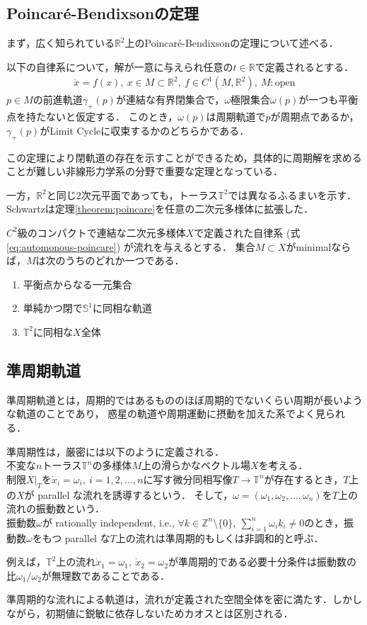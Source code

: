 \documentclass[../main]{subfiles}
\begin{document}
\subsection{Poincaré-Bendixsonの定理}
まず，広く知られている$\mathbb{R}^2$上のPoincaré-Bendixsonの定理について述べる．
\begin{theorem}
    以下の自律系について，解が一意に与えられ任意の$t\in\mathbb{R}$で定義されるとする．
    \begin{align}
        \dot{x}=f(x),\ x\in M\subset \mathbb{R}^2,\ f\in C^1(M,\mathbb{R}^2),\ M:\mathrm{open}         \label{eq:automonous-poincare}
    \end{align}
    $p\in M$の前進軌道$\gamma_+(p)$が連結な有界閉集合で，$\omega$極限集合$\omega(p)$が一つも平衡点を持たないと仮定する．
    このとき，$\omega(p)$は周期軌道で$p$が周期点であるか，$\gamma_+(p)$がLimit Cycleに収束するかのどちらかである．
    \label{theorem:poincare}
\end{theorem}
この定理により閉軌道の存在を示すことができるため，具体的に周期解を求めることが難しい非線形力学系の分野で重要な定理となっている．

一方，$\mathbb{R}^2$と同じ2次元平面であっても，トーラス$\mathbb{T}^2$では異なるふるまいを示す．
Schwartzは定理\ref{theorem:poincare}を任意の二次元多様体に拡張した\cite{Schwartz1963ErrataAG}．
\begin{theorem}
    \label{thm:poiben-gen}
    $C^2$級のコンパクトで連結な二次元多様体$X$で定義された自律系 (式\eqref{eq:automonous-poincare}) が流れを与えるとする．
    集合$M\subset X$がminimalならば，$M$は次のうちのどれか一つである．
    \begin{enumerate}
        \item 平衡点からなる一元集合
        \item 単純かつ閉で$\mathbb{S}^1$に同相な軌道
        \item $\mathbb{T}^2$に同相な$X$全体
    \end{enumerate}
\end{theorem}
\subsection{準周期軌道}
準周期軌道とは，周期的ではあるもののほぼ周期的でないくらい周期が長いような軌道のことであり，
惑星の軌道や周期運動に摂動を加えた系でよく見られる．

準周期性は，厳密には以下のように定義される\cite{Broer1996}．\\
不変な$n$トーラス$\mathbb{T}^n$の多様体$M$上の滑らかなベクトル場$X$を考える．\\
制限$X|_T$を$\dot{x}_i=\omega_i,\ i=1,2,\ldots ,n$に写す微分同相写像$T\to \mathbb{T}^n$が存在するとき，$T$上の$X$が parallel な流れを誘導するという．
そして，$\omega=(\omega_1,\omega_2,\ldots,\omega_n)$を$T$上の流れの振動数という．\\
振動数$\omega$が rationally independent, i.e., $\forall k\in\mathbb{Z}^n\setminus \{0\},\ \sum_{i=1}^n\omega_ik_i\neq 0$のとき，振動数$\omega$をもつ parallel な$T$上の流れは準周期的もしくは非調和的と呼ぶ．

例えば，$\mathbb{T}^2$上の流れ$\dot{x}_1=\omega_1,\ \dot{x}_2=\omega_2$が準周期的である必要十分条件は振動数の比$\omega_1/\omega_2$が無理数であることである．

準周期的な流れによる軌道は，流れが定義された空間全体を密に満たす．しかしながら，初期値に鋭敏に依存しないためカオスとは区別される．
\end{document}
